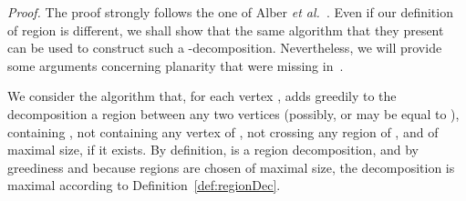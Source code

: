 \documentclass[a4paper,11pt]{article}
\newenvironment{proof}{\noindent \textit{Proof. }}{\hfill\vspace{.2cm}}
\begin{document}
\begin{proof} The proof strongly follows the one of Alber \emph{et al.}~\cite[Lemma 5 and Proposition 1]{AFN04}. Even if our definition of region is different, we shall show that the same algorithm that they present can be used to construct such a -decomposition. Nevertheless, we will provide some arguments concerning planarity that were missing in~\cite{AFN04}.

We consider the algorithm that, for each vertex , adds greedily to the decomposition  a region  between any two vertices  (possibly,  or  may be equal to ), containing ,
not containing any vertex of ,
not crossing any region of , and of maximal size, if it exists.
By definition,  is a region decomposition, and by greediness and because regions are chosen of maximal size, the decomposition is maximal according to Definition~\ref{def:regionDec}.


\end{proof}
\end{document}
